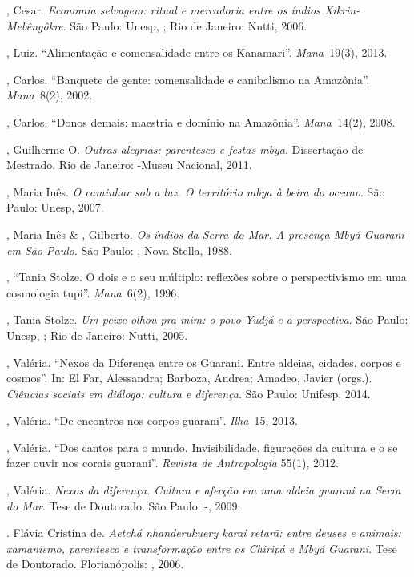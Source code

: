 {{\begin{Parskip}
, Cesar. \emph{Economia selvagem: ritual e mercadoria entre os índios
Xikrin-Mebêngôkre}. São Paulo: Unesp, ; Rio de Janeiro: Nutti, 2006.

, Luiz. ``Alimentação e comensalidade entre os Kanamari''. \emph{Mana~}19(3),
2013.

, Carlos. ``Banquete de gente: comensalidade e canibalismo na
Amazônia''. \emph{Mana~}8(2), 2002.

, Carlos. ``Donos demais: maestria e domínio na Amazônia''. \emph{Mana~}14(2),
2008.

, Guilherme O. \emph{Outras alegrias: parentesco e festas mbya}.
Dissertação de Mestrado. Rio de Janeiro: -Museu Nacional, 2011.

, Maria Inês. \emph{O caminhar sob a luz. O território mbya à beira do
oceano}. São Paulo: Unesp, 2007.

, Maria Inês \& , Gilberto. \emph{Os índios da Serra do Mar. A
presença Mbyá-Guarani em São Paulo}. São Paulo: , Nova Stella, 1988.

, ``Tania Stolze. O dois e o seu múltiplo: reflexões sobre o
perspectivismo em uma cosmologia tupi''. \emph{Mana~}6(2), 1996.

, Tania Stolze. \emph{Um peixe olhou pra mim: o povo Yudjá e a
perspectiva}. São Paulo: Unesp, ; Rio de Janeiro: Nutti, 2005.

, Valéria. ``Nexos da Diferença entre os Guarani. Entre
aldeias, cidades, corpos e cosmos''. In: El Far, Alessandra; Barboza,
Andrea; Amadeo, Javier (orgs.). \emph{Ciências sociais em diálogo: cultura e diferença}. São Paulo: Unifesp, 2014.

, Valéria. ``De encontros nos corpos guarani''. \emph{Ilha~}15, 2013.

, Valéria. ``Dos cantos para o mundo. Invisibilidade, figurações da
cultura e o se fazer ouvir nos corais guarani''. \emph{Revista de Antropologia}
55(1), 2012.

, Valéria. \emph{Nexos da diferença. Cultura e afecção em uma aldeia
guarani na Serra do Mar}. Tese de Doutorado. São Paulo: -, 2009.

. Flávia Cristina de. \emph{Aetchá nhanderukuery karai retarã: entre
deuses e animais: xamanismo, parentesco e transformação entre os
Chiripá e Mbyá Guarani}. Tese de Doutorado. Florianópolis: , 2006.


\end{Parskip}}}
